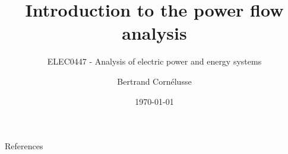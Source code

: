 \documentclass[aspectratio=169]{beamer}
\subtitle{ELEC0447 - Analysis of electric power and energy systems}
\title{Introduction to the power flow analysis}
\author[BC]{Bertrand Cornélusse}
\institute{University of Liège}
\date{\today}
\begin{document}


\begin{frame}[allowframebreaks]{References}


\end{frame}
\end{document}
